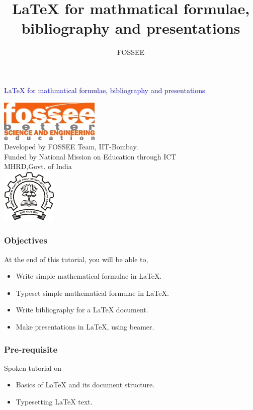 \documentclass{beamer}
\title [{\LaTeX} for mathematics \& beyond] {{\LaTeX} for mathmatical formulae, bibliography and presentations}
\author {FOSSEE}
\begin{document}
\begin{frame}
  \begin{center}
    \vspace{12pt}
    \textcolor{blue}{\huge {\LaTeX} for mathmatical formulae, bibliography and presentations}
  \end{center}
  \vspace{18pt}
  \begin{center}
    \vspace{10pt}
    \includegraphics[scale=0.95]{../images/fossee-logo.png}\\
    \vspace{5pt}
    \scriptsize Developed by FOSSEE Team, IIT-Bombay. \\ 
    \scriptsize Funded by National Mission on Education through ICT\\
    \scriptsize  MHRD,Govt. of India\\
    \includegraphics[scale=0.30]{../images/iitb-logo.png}\\
  \end{center}
\end{frame}

\begin{frame}
  \frametitle{Objectives}
  \label{sec-2}
    At the end of this tutorial, you will be able to,
  \begin{itemize}
    \item Write simple mathematical formulae in {\LaTeX}.
    \item Typeset simple mathematical formulae in {\LaTeX}.
    \item Write bibliography for a LaTeX document.
    \item Make presentations in LaTeX, using beamer.
  \end{itemize}
\end{frame}

\begin{frame}
  \frametitle{Pre-requisite}
  \label{sec-3}

  Spoken tutorial on -

  \begin{itemize}
    \item Basics of LaTeX and its document structure.
    \item Typesetting LaTeX text.
  \end{itemize}
\end{frame}
\end{document}
